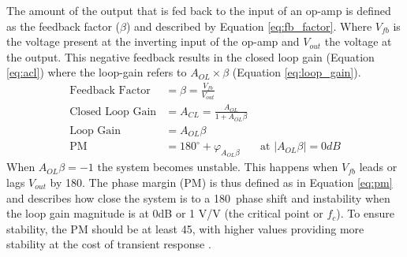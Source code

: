 The amount of the output that is fed back to the input of an op-amp is defined as the feedback factor ($\beta$) and described by Equation \ref{eq:fb_factor}. Where $V_{fb}$ is the voltage present at the inverting input of the op-amp and $V_{out}$ the voltage at the output. This negative feedback results in the closed loop gain (Equation \ref{eq:acl}) where the loop-gain refers to $A_{OL}\times\beta$ (Equation \ref{eq:loop_gain}).
\begin{align}
    \text{Feedback Factor} &= \beta = \frac{V_{fb}}{V_{out}}  \label{eq:fb_factor}\\
    \text{Closed Loop Gain} &= A_{CL} = \frac{A_{OL}}{1 + A_{OL}\beta} \label{eq:acl}\\
    \text{Loop Gain} &= A_{OL}\beta \label{eq:loop_gain}\\
    \text{PM} &= 180^\circ + \varphi_{A_{OL}\beta} &\text{ at } |A_{OL}\beta| = 0dB \label{eq:pm} 
\end{align}
When $A_{OL}\beta = -1$ the system becomes unstable. This happens when $V_{fb}$ leads or lags $V_{out}$ by 180\textdegree. The phase margin (PM) is thus defined as in Equation \ref{eq:pm} and describes how close the system is to a 180\textdegree\ phase shift and instability when the loop gain magnitude is at 0dB or 1 V/V (the critical point or $f_c$). To ensure stability, the PM should be at least 45\textdegree, with higher values providing more stability at the cost of transient response \cite{StabilizeYourTransimpedance}. 
